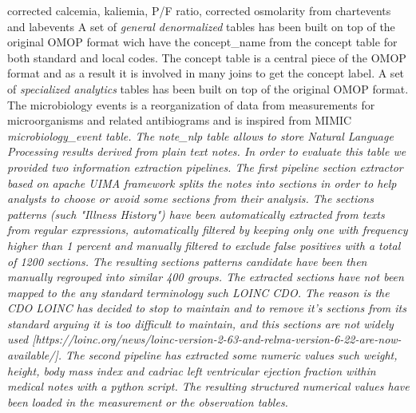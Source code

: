 corrected calcemia, kaliemia, P/F ratio, corrected osmolarity from chartevents and labevents
A set of \emph{general denormalized} tables has been built on top of the
original OMOP format wich have the concept\_name from the concept table for
both standard and local codes. The concept table is a central piece of the OMOP
format and as a result it is involved in many joins to get the concept label. 
A set of \emph{specialized analytics} tables has been built on top of the
original OMOP format. The microbiology events is a reorganization of data from
measurements for microorganisms and related antibiograms and is inspired from
MIMIC \it{microbiology_event} table. 
The \it{note_nlp} table allows to store Natural Language Processing results
derived from plain text notes. In order to evaluate this table we provided
two information extraction pipelines.
The \emph{first} pipeline \emph{section extractor} based on apache UIMA framework
splits the notes into sections in order to help analysts to choose or avoid
some sections from their analysis.  The sections patterns (such "Illness
History") have been automatically extracted from texts from regular
expressions, automatically filtered by keeping only one with frequency higher
than 1 percent and manually filtered to exclude false positives with a total of
1200 sections. The resulting sections patterns candidate have been then
manually regrouped into similar 400 groups.  The extracted sections have not
been mapped to the any standard terminology such LOINC CDO. The reason is the
CDO LOINC has decided to stop to maintain and to remove it's sections from its
standard arguing it is too difficult to maintain, and this sections are not
widely used
[https://loinc.org/news/loinc-version-2-63-and-relma-version-6-22-are-now-available/].
The \emph{second} pipeline has extracted some numeric values such weight,
height, body mass index and cadriac left ventricular ejection fraction within
medical notes with a python script. The resulting structured numerical values
have been loaded in the measurement or the observation tables.
